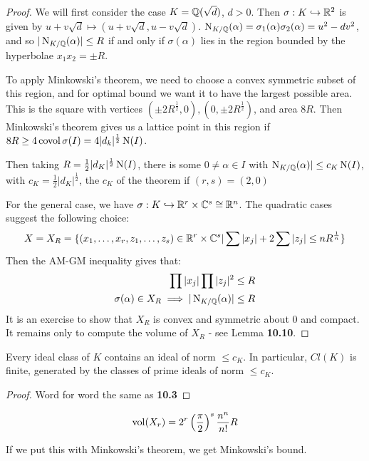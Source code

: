 \documentclass[10pt,a4paper]{article}
\begin{document}
\begin{proof}
We will first consider the case $K = \mathbb{Q}(\sqrt{d})$, $d > 0$. Then $\sigma:K \hookrightarrow \mathbb{R}^2$ is given by $u+v\sqrt{d} \mapsto (u+v\sqrt{d}, u-v\sqrt{d})$. $\operatorname{N}_{K/\mathbb{Q}}(\alpha) = \sigma_1(\alpha)\sigma_2(\alpha) = u^2-dv^2$, and so $|\operatorname{N}_{K/\mathbb{Q}}(\alpha)| \leq R$ if and only if $\sigma(\alpha)$ lies in the region bounded by the hyperbolae $x_1x_2 = \pm R$.
\begin{center}
\end{center}
To apply Minkowski's theorem, we need to choose a convex symmetric subset of this region, and for optimal bound we want it to have the largest possible area. This is the square with vertices $(\pm 2R^{\frac12},0),(0,\pm 2R^{\frac12})$, and area $8R$. Then Minkowski's theorem gives us a lattice point in this region if $8R \geq 4\operatorname{covol} \sigma(I) = 4|d_k|^{\frac12}\operatorname{N}(I)$.

Then taking $R = \frac12 |d_K|^{\frac12} \operatorname{N}(I)$, there is some $0 \neq \alpha \in I$ with $\operatorname{N}_{K/\mathbb{Q}}(\alpha)| \leq c_K \operatorname{N}(I)$, with $c_K = \frac{1}{2}|d_K|^{\frac12}$, the $c_K$ of the theorem if $(r,s) = (2,0)$

For the general case, we have $\sigma: K \hookrightarrow \mathbb{R}^r \times \mathbb{C}^s \cong \mathbb{R}^{n}$. The quadratic cases suggest the following choice:
\begin{align*}
X = X_R = \{(x_1, \ldots, x_r, z_1, \ldots, z_s) \in \mathbb{R}^r\times \mathbb{C}^s | \sum |x_j| + 2 \sum |z_j| \leq nR^\frac{1}{n}\}
\end{align*}
Then the AM-GM inequality gives that:
\begin{align*}
\prod |x_j| \prod |z_j|^2 &\leq R\\
\sigma(\alpha) \in X_R \implies |\operatorname{N}_{K/\mathbb{Q}}(\alpha)|&\leq R
\end{align*}
It is an exercise to show that $X_R$ is convex and symmetric about $0$ and compact. It remains only to compute the volume of $X_R$ - see Lemma \textbf{10.10}.
\end{proof}
\begin{corollary}
Every ideal class of $K$ contains an ideal of norm $\leq c_K$. In particular, $Cl(K)$ is finite, generated by the classes of prime ideals of norm $\leq c_K$.
\end{corollary}
\begin{proof}
Word for word the same as \textbf{10.3}
\end{proof}
\begin{lemma}
\begin{align*}
\operatorname{vol}(X_r) = 2^r \left(\frac{\pi}{2}\right)^s \frac{n^n}{n!}R
\end{align*}
\end{lemma}
If we put this with Minkowski's theorem, we get Minkowski's bound.
\end{document}
